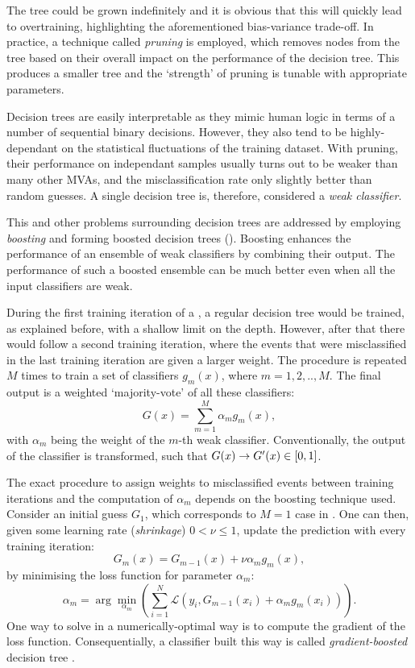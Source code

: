 The tree could be grown indefinitely and it is obvious that this will quickly lead to overtraining, highlighting the aforementioned bias-variance trade-off.
In practice, a technique called \textit{pruning} is employed, which removes nodes from the tree based on their overall impact on the performance of the decision tree.
This produces a smaller tree and the `strength' of pruning is tunable with appropriate parameters.

Decision trees are easily interpretable as they mimic human logic in terms of a number of sequential binary decisions.
However, they also tend to be highly-dependant on the statistical fluctuations of the training dataset.
With pruning, their performance on independant samples usually turns out to be weaker than many other MVAs, and the misclassification rate only slightly better than random guesses.
A single decision tree is, therefore, considered a \textit{weak classifier}.

This and other problems surrounding decision trees are addressed by employing \textit{boosting} and forming boosted decision trees ().
Boosting enhances the performance of an ensemble of weak classifiers by combining their output. 
The performance of such a boosted ensemble can be much better even when all the input classifiers are weak.

During the first training iteration of a \BDT, a regular decision tree would be trained, as explained before, with a shallow limit on the depth.
However, after that there would follow a second training iteration, where the events that were misclassified in the last training iteration are given a larger weight.
The procedure is repeated $M$ times to train a set of classifiers $g_{m}(x)$, where $m=1,2,..,M$.
The final output is a weighted `majority-vote' of all these classifiers:
\begin{equation}\label{eq:boosted_classifier}
    G(x) = \sum_{m=1}^M\alpha_mg_m(x),
\end{equation}
with $\alpha_m$ being the weight of the $m$-th weak classifier.
Conventionally, the output of the classifier is transformed, such that $G(x)\rightarrow G'(x)\in[0,1]$.

The exact procedure to assign weights to misclassified events between training iterations and the computation of $\alpha_m$ depends on the boosting technique used.
Consider an initial guess $G_1$, which corresponds to $M=1$ case in .
One can then, given some learning rate (\textit{shrinkage}) $0<\nu\leq1$, update the prediction with every training iteration:
\begin{equation}
    G_m(x) = G_{m-1}(x) + \nu\alpha_mg_m(x),
\end{equation}
by minimising the loss function for parameter $\alpha_m$: 
\begin{equation}\label{eq:minimize_loss}
    \alpha_m = \arg\min_{\alpha_m}\left(\sum_{i=1}^N\mathcal{L}(y_i, G_{m-1}(x_i) + \alpha_mg_m(x_i))\right).
\end{equation}
One way to solve  in a numerically-optimal way is to compute the gradient of the loss function.
Consequentially, a classifier built this way is called \textit{gradient-boosted} decision tree \cite{FRIEDMAN1013203451}.

